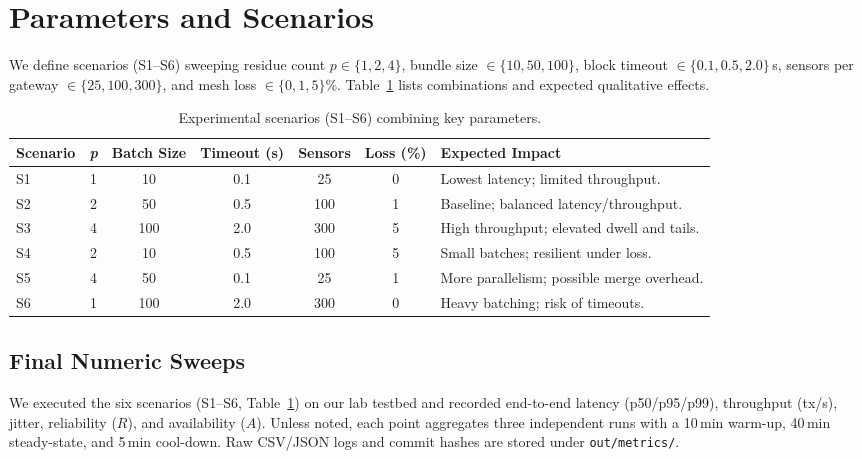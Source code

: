 \documentclass[12pt,onecolumn]{IEEEtran} %
\begin{document}
\section{Parameters and Scenarios}
\label{sec:params-scenarios}

We define scenarios (S1--S6) sweeping residue count $p\in\{1,2,4\}$, bundle size $\in\{10,50,100\}$, block timeout $\in\{0.1,0.5,2.0\}$\,s, sensors per gateway $\in\{25,100,300\}$, and mesh loss $\in\{0,1,5\}\%$. Table~\ref{tab:scenarios} lists combinations and expected qualitative effects.

\begin{table}[htbp]
  \centering
  \caption{Experimental scenarios (S1--S6) combining key parameters.}
  \label{tab:scenarios}
  \small
  \begin{tabular}{lccccc>{\raggedright\arraybackslash}p{3.5cm}}
    \toprule
    \textbf{Scenario} & \textbf{\textit{p}} & \textbf{Batch Size} & \textbf{Timeout (s)} & \textbf{Sensors} & \textbf{Loss (\%)} & \textbf{Expected Impact} \\
    \midrule
    S1 & 1 & 10  & 0.1 & 25  & 0 & Lowest latency; limited throughput. \\
    S2 & 2 & 50  & 0.5 & 100 & 1 & Baseline; balanced latency/throughput. \\
    S3 & 4 & 100 & 2.0 & 300 & 5 & High throughput; elevated dwell and tails. \\
    S4 & 2 & 10  & 0.5 & 100 & 5 & Small batches; resilient under loss. \\
    S5 & 4 & 50  & 0.1 & 25  & 1 & More parallelism; possible merge overhead. \\
    S6 & 1 & 100 & 2.0 & 300 & 0 & Heavy batching; risk of timeouts. \\
    \bottomrule
  \end{tabular}
\end{table}


\subsection{Final Numeric Sweeps}
\label{sec:numeric-sweeps}

We executed the six scenarios (S1--S6, Table~\ref{tab:scenarios}) on our lab testbed and recorded end-to-end latency (p50/p95/p99), throughput (tx/s), jitter, reliability ($R$), and availability ($A$).
Unless noted, each point aggregates three independent runs with a 10\,min warm-up, 40\,min steady-state, and 5\,min cool-down. Raw CSV/JSON logs and commit hashes are stored under \texttt{out/metrics/}.
\end{document}
